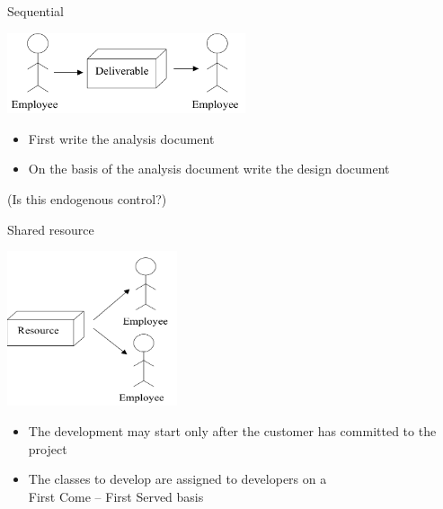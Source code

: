 \documentclass{beamer}
\begin{document}
\begin{frame}{\centerline{Sequential}}

\begin{center}
\includegraphics[width=70mm]{A2022.IDSEPC.ProcessoDiProduzione/img-img11.png}
\end{center}

\begin{itemize}
\item  First write the analysis document


\item  On the basis of the analysis document write the design document


 
\end{itemize}

(Is this endogenous control?)
\end{frame}

\begin{frame}{\centerline{Shared resource}}
\begin{center}
\includegraphics[width=50mm]{A2022.IDSEPC.ProcessoDiProduzione/img-img12.png}
\end{center}

\begin{itemize}
\item  The development may start only after the customer has committed to the project

\item  The classes to develop are assigned to developers on a \\ First Come – First Served basis

\end{itemize}


\end{frame}
\end{document}
